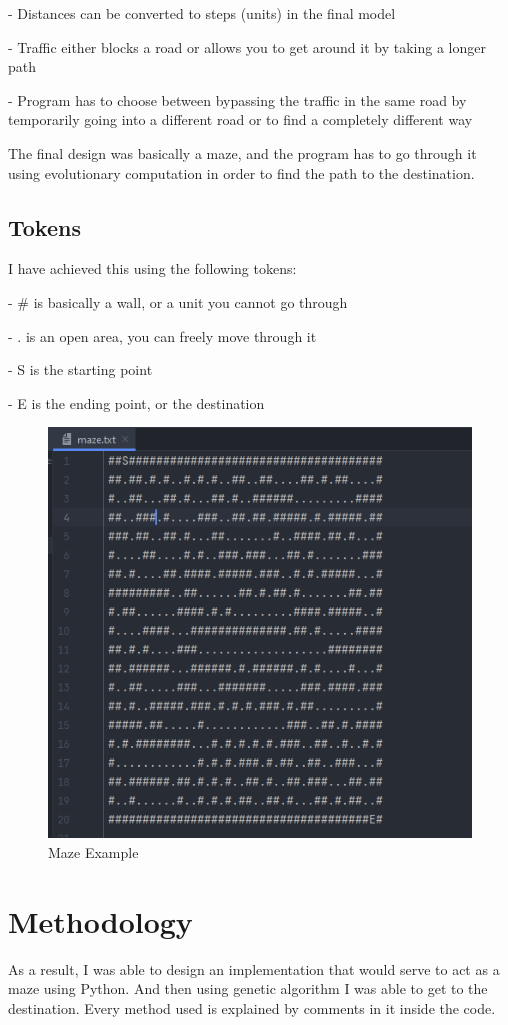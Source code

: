 \documentclass{article}
\begin{document}
- Distances can be converted to steps (units) in the final model

- Traffic either blocks a road or allows you to get around it by taking a longer path

- Program has to choose between bypassing the traffic in the same road by temporarily going into a different road or to find a completely different way

The final design was basically a maze, and the program has to go through it using evolutionary computation in order to find the path to the destination.

\subsection{Tokens}

I have achieved this using the following tokens:

- \# is basically a wall, or a unit you cannot go through

- . is an open area, you can freely move through it

- S is the starting point

- E is the ending point, or the destination

\begin{figure}[htb!]
\centerline
{\includegraphics[width=65 mm,scale=1.0]{maze.png}}
\caption{Maze Example}
\end{figure}

\newpage

\section{Methodology}
As a result, I was able to design an implementation that would serve to act as a maze using Python. And then using genetic algorithm I was able to get to the destination. Every method used is explained by comments in it inside the code.
\end{document}
